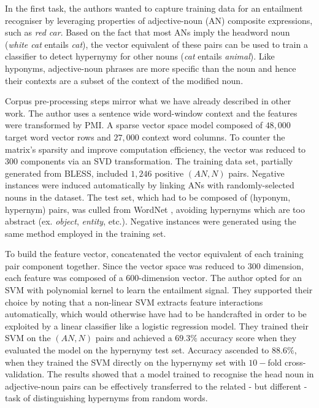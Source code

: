 In the first task, the authors wanted to capture training data for an entailment recogniser by leveraging properties of adjective-noun (AN) composite expressions, such as \textit{red car}.  Based on the fact that most ANs imply the headword noun (\textit{white cat} entails \textit{cat}), the vector equivalent of these pairs can be used to train a classifier to detect hypernymy for other nouns (\textit{cat} entails \textit{animal}).  Like hyponyms, adjective-noun phrases are more specific than the noun and hence their contexts are a subset of the context of the modified noun. 

Corpus pre-processing steps mirror what we have already described in other work.  The author uses a sentence wide word-window context and the features were transformed by \ac{PMI}.  A sparse vector space model composed of $48,000$ target word vector rows and $27,000$ context word columns.  To counter the matrix’s sparsity and improve computation efficiency, the vector was reduced to $300$ components via an \ac{SVD} transformation.  The training data set, partially generated from BLESS, included $1,246$ positive $(AN, N)$ pairs.  Negative instances were induced automatically by linking ANs with randomly-selected nouns in the dataset.  The test set, which had to be composed of (hyponym, hypernym) pairs, was culled from WordNet \citep{Miller1995}, avoiding hypernyms which are too abstract (ex. \textit{object}, \textit{entity}, etc.).  Negative instances were generated using the same method employed in the training set.  

To build the feature vector, \citeauthor{baroni2012entailment} concatenated the vector equivalent of each training pair component together.  Since the vector space was reduced to $300$ dimension, each feature was composed of a $600$-dimension vector.  The author opted for an \ac{SVM} with polynomial kernel to learn the entailment signal.  They supported their choice by noting that a non-linear \ac{SVM} extracts feature interactions automatically, which would otherwise have had to be handcrafted in order to be exploited by a linear classifier like a logistic regression model.  They trained their \ac{SVM} on the $(AN, N)$ pairs and achieved a $69.3\%$ accuracy score when they evaluated the model on the hypernymy test set.  Accuracy ascended to $88.6\%$, when they trained the \ac{SVM} directly on the hypernymy set with $10-$fold cross-validation.  The results showed that a model trained to recognise the head noun in adjective-noun pairs can be effectively transferred to the related - but different - task of distinguishing hypernyms from random words.

